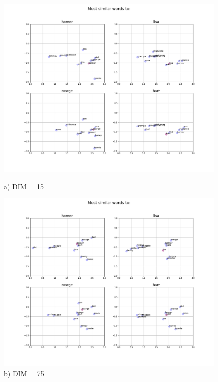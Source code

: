 \begin{figure}[H]
\centering
\begin{minipage}{0.45\textwidth}
\includegraphics[trim=4.2cm 3cm 3.7cm 3cm, clip=true, width=\textwidth]{results/embeddings/simpsons_similar_15.png}
\caption*{a) DIM = 15}
\end{minipage}\hfill
\begin{minipage}{0.45\textwidth}
\includegraphics[trim=4.2cm 3cm 3.7cm 3cm, clip=true, width=\textwidth]{results/embeddings/simpsons_similar_75.png}
\caption*{b) DIM = 75}
\end{minipage}\par

\end{figure}
